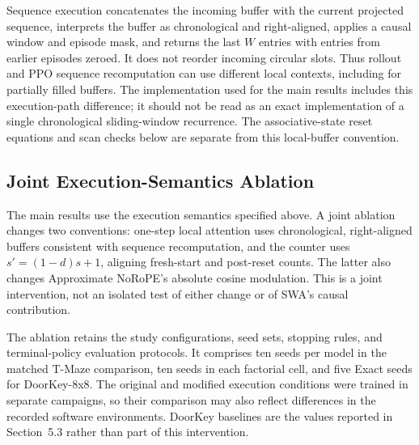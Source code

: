Sequence execution concatenates the incoming buffer with the current projected
sequence, interprets the buffer as chronological and right-aligned, applies a
causal window and episode mask, and returns the last $W$ entries with entries
from earlier episodes zeroed. It does not reorder incoming circular slots.
Thus rollout and PPO sequence recomputation can use different local contexts,
including for partially filled buffers. The implementation used for the main results
includes this execution-path difference; it should not be read as an exact
implementation of a single chronological sliding-window recurrence. The
associative-state reset equations and scan checks below are separate from this
local-buffer convention.

\subsection{Joint Execution-Semantics Ablation}
\label{app:execution_sensitivity}
The main results use the execution semantics specified above. A joint ablation
changes two conventions: one-step local attention uses
chronological, right-aligned buffers consistent with sequence recomputation, and
the counter uses $s'=(1-d)s+1$, aligning fresh-start and post-reset counts.
The latter also changes Approximate NoRoPE's absolute cosine modulation. This is
a joint intervention, not an isolated test of either change or of SWA's causal
contribution.

The ablation retains the study configurations, seed sets, stopping rules, and
terminal-policy evaluation protocols. It comprises ten seeds per model in the
matched T-Maze comparison, ten seeds in each factorial cell, and five Exact seeds
for DoorKey-8x8. The original and modified execution conditions were trained in
separate campaigns, so their comparison may also reflect differences in the
recorded software environments. DoorKey baselines are the values reported in
Section~5.3 rather than part of this intervention.

